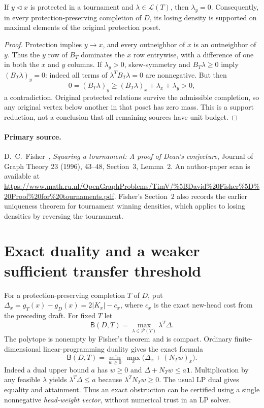 \begin{lemma}
\label{lem:transport-protection-support}
If $y\triangleleft x$ is protected in a tournament and
$\lambda\in\mathcal L(T)$, then $\lambda_y=0$. Consequently, in
every protection-preserving completion of $D$, its losing density is
supported on maximal elements of the original protection poset.
\end{lemma}
\begin{proof}
Protection implies $y\to x$, and every outneighbor of $x$ is an
outneighbor of $y$. Thus the $y$ row of $B_T$ dominates the $x$ row
entrywise, with a difference of one in both the $x$ and $y$ columns.
If $\lambda_y>0$, skew-symmetry and $B_T\lambda\ge0$ imply
$(B_T\lambda)_y=0$: indeed all terms of
$\lambda^TB_T\lambda=0$ are nonnegative. But then
\[
 0=(B_T\lambda)_y\ge(B_T\lambda)_x+\lambda_x+\lambda_y>0,
\]
a contradiction. Original protected relations survive the admissible
completion, so any original vertex below another in that poset has
zero mass. This is a support reduction, not a conclusion that all
remaining sources have unit budget.
\end{proof}

\paragraph{Primary source.}
D.~C.~Fisher~\cite{Fisher1996}, \emph{Squaring a tournament: A proof of Dean's conjecture},
Journal of Graph Theory 23 (1996), 43--48, Section~3, Lemma~2.
An author-paper scan is available at
\url{https://www.math.ru.nl/OpenGraphProblems/TimV/%5BDavid%20Fisher%5D%20Proof%20for%20tournaments.pdf}.
Fisher's Section~2 also records the earlier uniqueness theorem for
tournament winning densities, which applies to losing densities by
reversing the tournament.

\section{Exact duality and a weaker sufficient transfer threshold}
\label{sec:weighted-transport-exact-dual}

For a protection-preserving completion $T$ of $D$, put
$\Delta_x=g_T(x)-g_D(x)=2|K_x|-c_x$, where $c_x$ is the exact
new-head cost from the preceding draft. For fixed $T$ let
\[
 \mathsf B(D,T)=\max_{\lambda\in\mathcal P(T)}\lambda^T\Delta.
\]
The polytope is nonempty by Fisher's theorem and is compact. Ordinary
finite-dimensional linear-programming duality gives the exact formula
\begin{equation}
 \mathsf B(D,T)=
 \min_{w\ge0}\ \max_x\bigl(\Delta_x+(N_Tw)_x\bigr).
 \label{eq:transport-dual-formula}
\end{equation}
Indeed a dual upper bound $a$ has $w\ge0$ and
$\Delta+N_Tw\le a\mathbf1$. Multiplication by any feasible $\lambda$
yields $\lambda^T\Delta\le a$ because
$\lambda^TN_Tw\ge0$. The usual LP dual gives equality and attainment.
Thus an exact obstruction can be certified using a single nonnegative
\emph{head-weight vector}, without numerical trust in an LP solver.

